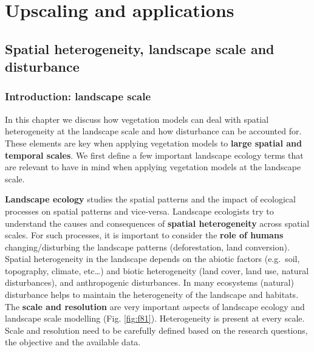 \documentclass[12pt,oneside]{book}
\begin{document}
\part{Upscaling and
applications}\label{part-upscaling-and-applications}

\chapter{Spatial heterogeneity, landscape scale and
disturbance}\label{spatial-heterogeneity-landscape-scale-and-disturbance}


\section{Introduction: landscape
scale}\label{introduction-landscape-scale}

In this chapter we discuss how vegetation models can deal with spatial
heterogeneity at the landscape scale and how disturbance can be
accounted for. These elements are key when applying vegetation models to
\textbf{large spatial and temporal scales}. We first define a few
important landscape ecology terms that are relevant to have in mind when
applying vegetation models at the landscape scale.

\textbf{Landscape ecology} studies the spatial patterns and the impact
of ecological processes on spatial patterns and vice-versa. Landscape
ecologists try to understand the causes and consequences of
\textbf{spatial heterogeneity} across spatial scales. For such
processes, it is important to consider the \textbf{role of humans}
changing/disturbing the landscape patterns (deforestation, land
conversion). Spatial heterogeneity in the landscape depends on the
abiotic factors (e.g.~soil, topography, climate, etc\ldots{}) and biotic
heterogeneity (land cover, land use, natural disturbances), and
anthropogenic disturbances. In many ecosystems (natural) disturbance
helps to maintain the heterogeneity of the landscape and habitats. The
\textbf{scale and resolution} are very important aspects of landscape
ecology and landscape scale modelling (Fig. \ref{fig:f81}).
Heterogeneity is present at every scale. Scale and resolution need to be
carefully defined based on the research questions, the objective and the
available data.
\end{document}
